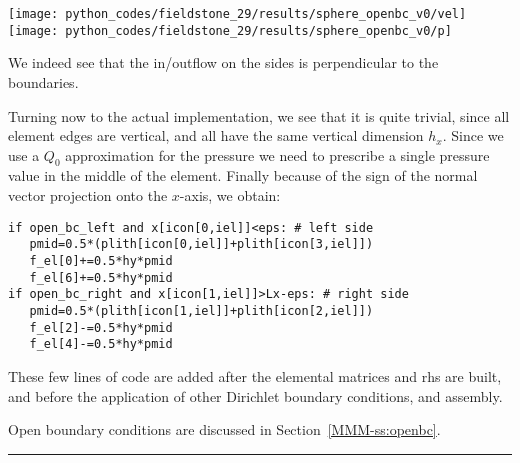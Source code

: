 \begin{center}
\texttt{[image: python\_codes/fieldstone\_29/results/sphere\_openbc\_v0/vel]}
\texttt{[image: python\_codes/fieldstone\_29/results/sphere\_openbc\_v0/p]}
\end{center}

We indeed see that the in/outflow on the sides is perpendicular to the boundaries. 

Turning now to the actual implementation, we see that it is quite trivial, since 
all element edges are vertical, and all have the same vertical dimension $h_x$. 
Since we use a $Q_0$ approximation for the pressure we need to prescribe a single
pressure value in the middle of the element. Finally because of the sign of the 
normal vector projection onto the $x$-axis, we obtain:

\begin{lstlisting}
if open_bc_left and x[icon[0,iel]]<eps: # left side
   pmid=0.5*(plith[icon[0,iel]]+plith[icon[3,iel]])
   f_el[0]+=0.5*hy*pmid
   f_el[6]+=0.5*hy*pmid
if open_bc_right and x[icon[1,iel]]>Lx-eps: # right side
   pmid=0.5*(plith[icon[1,iel]]+plith[icon[2,iel]])
   f_el[2]-=0.5*hy*pmid
   f_el[4]-=0.5*hy*pmid
\end{lstlisting}

These few lines of code are added after the elemental matrices and rhs are built, 
and before the application of other Dirichlet boundary conditions, and assembly.

Open boundary conditions are discussed in Section~\ref{MMM-ss:openbc}.

\par\noindent\rule{\textwidth}{0.4pt}

\vspace{.5cm}

\begin{center}
\end{center}



